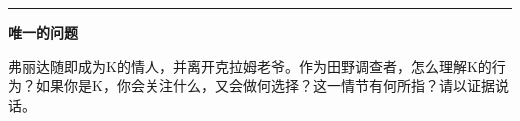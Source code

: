 \documentclass[12pt,a4paper]{article}
\begin{document}
\vspace{1em}
\noindent\rule{\textwidth}{0.4pt}
\vspace{0.8em}

{\large\bfseries 唯一的问题}

\vspace{0.5em}

{弗丽达随即成为K的情人，并离开克拉姆老爷。作为田野调查者，怎么理解K的行为？如果你是K，你会关注什么，又会做何选择？这一情节有何所指？请以证据说话。}
\end{document}
